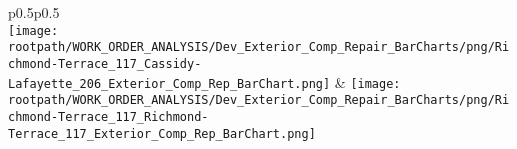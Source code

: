                         \begin{center}
                        \tablehead{\hspace{1cm}\\}
                        \tabletail{\hspace{1cm}\\}
                        \begin{supertabular}{p{0.5\textwidth}p{0.5\textwidth}}
                         \\
                        \texttt{[image: \\rootpath/WORK\_ORDER\_ANALYSIS/Dev\_Exterior\_Comp\_Repair\_BarCharts/png/Richmond-Terrace\_117\_Cassidy-Lafayette\_206\_Exterior\_Comp\_Rep\_BarChart.png]} & \texttt{[image: \\rootpath/WORK\_ORDER\_ANALYSIS/Dev\_Exterior\_Comp\_Repair\_BarCharts/png/Richmond-Terrace\_117\_Richmond-Terrace\_117\_Exterior\_Comp\_Rep\_BarChart.png]} \\
                                        \end{supertabular}
\end{center}

